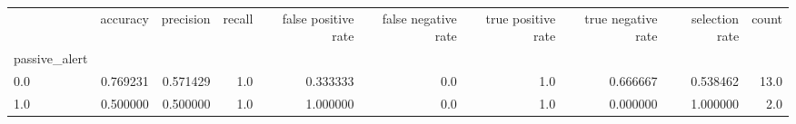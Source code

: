 \begin{tabular}{lrrrrrrrrr}
\toprule
{} &  accuracy &  precision &  recall &  false positive rate &  false negative rate &  true positive rate &  true negative rate &  selection rate &  count \\
passive\_alert &           &            &         &                      &                      &                     &                     &                 &        \\
\midrule
0.0           &  0.769231 &   0.571429 &     1.0 &             0.333333 &                  0.0 &                 1.0 &            0.666667 &        0.538462 &   13.0 \\
1.0           &  0.500000 &   0.500000 &     1.0 &             1.000000 &                  0.0 &                 1.0 &            0.000000 &        1.000000 &    2.0 \\
\bottomrule
\end{tabular}
